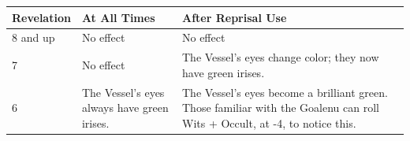 \begin{table}[H]
    \begin{tabularx}{\textwidth}{|l|X|X|}
        \hline
        Revelation & At All Times                                                                                                                                                                                                                                                                                                 & After Reprisal Use                                                                                                                                                                                                                                                                                                                   \\ \hline
        8 and up   & No effect                                                                                                                                                                                                                                                                                                    & No effect                                                                                                                                                                                                                                                                                                                            \\ \hline
        7          & No effect                                                                                                                                                                                                                                                                                                    & The Vessel's eyes change color; they now have green irises.                                                                                                                                                                                                                                                                          \\ \hline
        6          & The Vessel's eyes always have green irises.                                                                                                                                                                                                                                                                  & The Vessel's eyes become a brilliant green. Those familiar with the Goalenu can roll Wits + Occult, at -4, to notice this.                                                                                                                                                                                                           \\ \hline

\end{tabularx}
\end{table}
